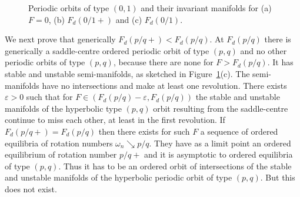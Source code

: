 \documentclass[12pt]{article}
\newcommand{\eps}{\varepsilon}
\newcounter{number}
\newcommand{\RSM}{\textcolor{red}}
\newcommand{\WQ}{\textcolor{blue}}
\begin{document}
\begin{figure}[htbp]

   \caption{Periodic orbits of type $(0,1)$ and their invariant manifolds for (a) $F=0$, (b) $F_d(0/1+)$ and (c) $F_d(0/1)$. %
   }
   \label{fig:manifolds}
\end{figure}

We next prove that generically $F_d(p/q+)<F_d(p/q)$.  At $F_d(p/q)$ there is generically a saddle-centre ordered periodic orbit of type $(p,q)$ and no other periodic orbits of type $(p,q)$, because there are none for $F>F_d(p/q)$.  It has stable and unstable semi-manifolds, as sketched in Figure~\ref{fig:manifolds}(c).  The semi-manifolds have no intersections and make at least one revolution.  There exists $\eps>0$ such that for $F \in (F_d(p/q)-\eps,F_d(p/q))$ the stable and unstable manifolds of the hyperbolic type $(p,q)$ orbit resulting from the saddle-centre continue to miss each other, at least in the first revolution.  If $F_d(p/q+) = F_d(p/q)$ then there exists for such $F$ a sequence of ordered equilibria of rotation numbers $\omega_n \searrow p/q$.  They have as a limit point an ordered equilibrium of rotation number $p/q+$ and it is asymptotic to ordered equilibria of type $(p,q)$.  Thus it has to be an ordered orbit of intersections of the stable and unstable manifolds of the hyperbolic periodic orbit of type $(p,q)$.  But this does not exist. 







\end{document}

